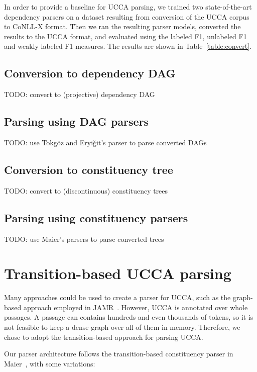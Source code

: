 \documentclass[11pt]{article}
\begin{document}
In order to provide a baseline for UCCA parsing, we trained two state-of-the-art dependency parsers on a dataset resulting from conversion of the UCCA corpus to CoNLL-X format. Then we ran the resulting parser models, converted the results to the UCCA format, and evaluated using the labeled F1, unlabeled F1 and weakly labeled F1 measures. The results are shown in Table~\ref{table:convert}.

\subsection{Conversion to dependency DAG}

TODO: convert to (projective) dependency DAG

\subsection{Parsing using DAG parsers}

TODO: use Tokg\"oz and Eryi\u{g}it's parser to parse converted DAGs \cite{tokgoz2015transition}

\subsection{Conversion to constituency tree}

TODO: convert to (discontinuous) constituency trees

\subsection{Parsing using constituency parsers}

TODO: use Maier's parsers to parse converted trees

\section{Transition-based UCCA parsing}

Many approaches could be used to create a parser for UCCA, such as the graph-based approach employed in JAMR~\cite{flanigan2014discriminative}.
However, UCCA is annotated over whole passages. A passage can contains hundreds and even thousands of tokens, so it is not feasible to keep a dense graph over all of them in memory. Therefore, we chose to adopt the transition-based approach for parsing UCCA.

Our parser architecture follows the transition-based constituency parser in Maier~, with some variations:
\end{document}
